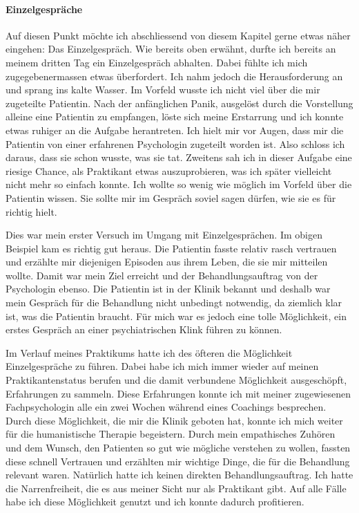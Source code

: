 \paragraph{Einzelgespräche}
Auf diesen Punkt möchte ich abschliessend von diesem Kapitel gerne etwas näher eingehen: Das Einzelgespräch. Wie bereits oben erwähnt, durfte ich bereits an meinem dritten Tag ein Einzelgespräch abhalten. Dabei fühlte ich mich zugegebenermassen etwas überfordert. Ich nahm jedoch die Herausforderung an und sprang ins kalte Wasser. Im Vorfeld wusste ich nicht viel über die mir zugeteilte Patientin. Nach der anfänglichen Panik, ausgelöst durch die Vorstellung alleine eine Patientin zu empfangen, löste sich meine Erstarrung und ich konnte etwas ruhiger an die Aufgabe herantreten. Ich hielt mir vor Augen, dass mir die Patientin von einer erfahrenen Psychologin zugeteilt worden ist. Also schloss ich daraus, dass sie schon wusste, was sie tat. Zweitens sah ich in dieser Aufgabe eine riesige Chance, als Praktikant etwas auszuprobieren, was ich später vielleicht nicht mehr so einfach konnte. Ich wollte so wenig wie möglich im Vorfeld über die Patientin wissen. Sie sollte mir im Gespräch soviel sagen dürfen, wie sie es für richtig hielt. 

Dies war mein erster Versuch im Umgang mit Einzelgesprächen. Im obigen Beispiel kam es richtig gut heraus. Die Patientin fasste relativ rasch vertrauen und erzählte mir diejenigen Episoden aus ihrem Leben, die sie mir mitteilen wollte. Damit war mein Ziel erreicht und der Behandlungsauftrag von der Psychologin ebenso. Die Patientin ist in der Klinik bekannt und deshalb war mein Gespräch für die Behandlung nicht unbedingt notwendig, da ziemlich klar ist, was die Patientin braucht. Für mich war es jedoch eine tolle Möglichkeit, ein erstes Gespräch an einer psychiatrischen Klink führen zu können.

Im Verlauf meines Praktikums hatte ich des öfteren die Möglichkeit Einzelgespräche zu führen. Dabei habe ich mich immer wieder auf meinen Praktikantenstatus berufen und die damit verbundene Möglichkeit ausgeschöpft, Erfahrungen zu sammeln. Diese Erfahrungen konnte ich mit meiner zugewiesenen Fachpsychologin alle ein zwei Wochen während eines Coachings besprechen. Durch diese Möglichkeit, die mir die Klinik geboten hat, konnte ich mich weiter für die humanistische Therapie begeistern. Durch mein empathisches Zuhören und dem Wunsch, den Patienten so gut wie mögliche verstehen zu wollen, fassten diese schnell Vertrauen und erzählten mir wichtige Dinge, die für die Behandlung relevant waren. Natürlich hatte ich keinen direkten Behandlungsauftrag. Ich hatte die Narrenfreiheit, die es aus meiner Sicht nur als Praktikant gibt. Auf alle Fälle habe ich diese Möglichkeit genutzt und ich konnte dadurch profitieren.

